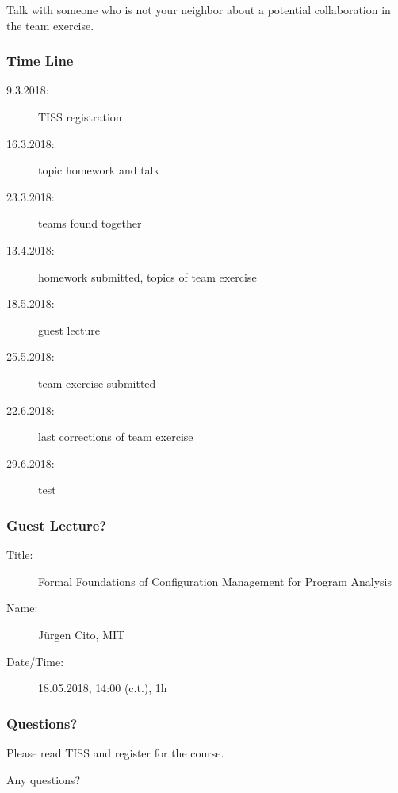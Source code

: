 \begin{assignment}
	\begin{task}
	Talk with someone who is not your neighbor about a potential collaboration in the team exercise.
	\end{task}
\end{assignment}

\begin{frame}
	\frametitle{Time Line}
	\begin{description}
		\item[9.3.2018:] TISS registration
		\item[16.3.2018:] topic homework and talk
		\item[23.3.2018:] teams found together
		\item[13.4.2018:] homework submitted, topics of team exercise
		\item[18.5.2018:] guest lecture
		\item[25.5.2018:] team exercise submitted
		\item[22.6.2018:] last corrections of team exercise
		\item[29.6.2018:] test
	\end{description}
\end{frame}

\begin{frame}
	\frametitle{Guest Lecture?}
	\begin{description}
		\item[Title:] Formal Foundations of Configuration Management for Program Analysis
		\item[Name:] Jürgen Cito, MIT
		\item[Date/Time:] 18.05.2018, 14:00 (c.t.), 1h
	\end{description}
\end{frame}

\begin{assignment}
	\frametitle{Questions?}
	\begin{task}
	Please read TISS and register for the course.
	\end{task}

	\begin{task}
	Any questions?
	\end{task}
\end{assignment}



\nocite{raab2017introducing}

\appendix

\begin{frame}[allowframebreaks]
	
	
\end{frame}





